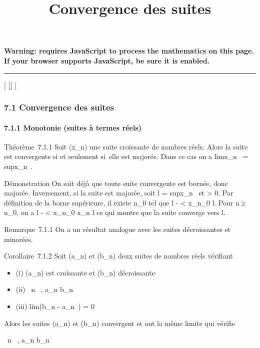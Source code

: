 \documentclass[]{article}
\title{Convergence des suites}
\author{}
\date{}
\begin{document}
\maketitle

\textbf{Warning: 
requires JavaScript to process the mathematics on this page.\\ If your
browser supports JavaScript, be sure it is enabled.}

\begin{center}\rule{3in}{0.4pt}\end{center}

[
[]
[

\subsubsection{7.1 Convergence des suites}

\paragraph{7.1.1 Monotonie (suites à termes réels)}

Théorème~7.1.1 Soit (x_n) une suite croissante de nombres
réels. Alors la suite est convergente si et seulement si~elle est
majorée. Dans ce cas on a limx_n~
= supx_n~.

Démonstration On sait déjà que toute suite convergente est bornée, donc
majorée. Inversement, si la suite est majorée, soit l
= supx_n~ et \epsilon > 0. Par
définition de la borne supérieure, il existe n_0 tel que l - \epsilon
< x_n_0 \leq l. Pour n ≥ n_0, on a l -
\epsilon < x_n_0 \leq x_n \leq l ce qui montre
que la suite converge vers l.

Remarque~7.1.1 On a un résultat analogue avec les suites décroissantes
et minorées.

Corollaire~7.1.2 Soit (a_n) et (b_n) deux suites de
nombres réels vérifiant

\begin{itemize}
\itemsep1pt\parskip0pt
\item
  (i) (a_n) est croissante et (b_n) décroissante
\item
  (ii) \forall~n \in {}~, a_n \leq b_n~
\item
  (iii) lim(b_n - a_n~) = 0
\end{itemize}

Alors les suites (a_n) et (b_n) convergent et ont la
même limite \ell qui vérifie

\forall~n \in {}~, a_n \leq \ell \leq b_n~
\end{document}
